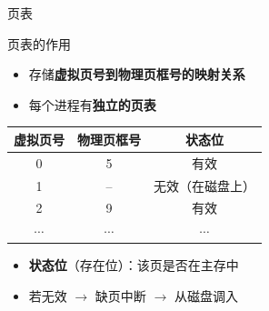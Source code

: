 \documentclass[10pt, aspectratio=169]{beamer}
\begin{document}
\begin{frame}{页表}
    \begin{block}{页表的作用}
        \begin{itemize}
            \item 存储\textbf{虚拟页号到物理页框号的映射关系}
            \item 每个进程有\textbf{独立的页表}
        \end{itemize}
    \end{block}
    \vspace{0.3em}
    \begin{center}
        \begin{tabular}{|c|c|c|}
            \hline
            \textbf{虚拟页号} & \textbf{物理页框号} & \textbf{状态位} \\
            \hline
            0 & 5 & 有效 \\
            \hline
            1 & -- & 无效（在磁盘上） \\
            \hline
            2 & 9 & 有效 \\
            \hline
            $\cdots$ & $\cdots$ & $\cdots$ \\
            \hline
        \end{tabular}
    \end{center}
    \vspace{0.3em}
    \begin{itemize}
        \item \textbf{状态位}（存在位）：该页是否在主存中
        \item 若无效 $\to$ 缺页中断 $\to$ 从磁盘调入
    \end{itemize}
\end{frame}
\end{document}
